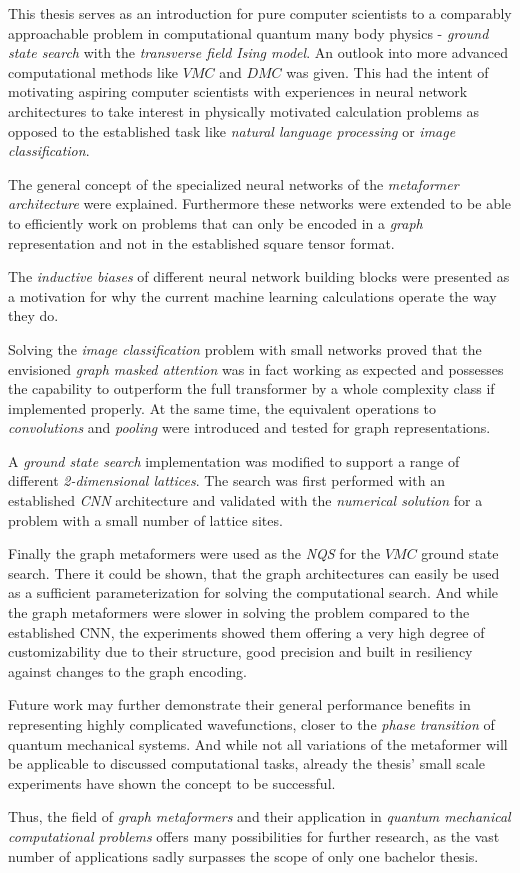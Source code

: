 This thesis serves as an introduction for pure computer scientists to a comparably approachable problem in computational quantum many body physics - \emph{ground state search} with the \emph{transverse field Ising model}.
An outlook into more advanced computational methods like $VMC$ and $DMC$ was given.
This had the intent of motivating aspiring computer scientists with experiences in neural network architectures to take interest in physically motivated calculation problems as opposed to the established task like \emph{natural language processing} or \emph{image classification}.

The general concept of the specialized neural networks of the \emph{metaformer architecture} were explained.
Furthermore these networks were extended to be able to efficiently work on problems that can only be encoded in a \emph{graph} representation and not in the established square tensor format.

The \emph{inductive biases} of different neural network building blocks were presented as a motivation for why the current machine learning calculations operate the way they do.

Solving the \emph{image classification} problem with small networks proved that the envisioned \emph{graph masked attention} was in fact working as expected and possesses the capability to outperform the full transformer by a whole complexity class if implemented properly.
At the same time, the equivalent operations to \emph{convolutions} and \emph{pooling} were introduced and tested for graph representations.

A \emph{ground state search} implementation was modified to support a range of different \emph{2-dimensional lattices}.
The search was first performed with an established \emph{CNN} architecture and validated with the \emph{numerical solution} for a problem with a small number of lattice sites.

Finally the graph metaformers were used as the \emph{NQS} for the $VMC$ ground state search.
There it could be shown, that the graph architectures can easily be used as a sufficient parameterization for solving the computational search.
And while the graph metaformers were slower in solving the problem compared to the established CNN, the experiments showed them offering a very high degree of customizability due to their structure, good precision and built in resiliency against changes to the graph encoding.

Future work may further demonstrate their general performance benefits in representing highly complicated wavefunctions, closer to the \emph{phase transition} of quantum mechanical systems.
And while not all variations of the metaformer will be applicable to discussed computational tasks, already the thesis' small scale experiments have shown the concept to be successful.

Thus, the field of \emph{graph metaformers} and their application in \emph{quantum mechanical computational problems} offers many possibilities for further research, as the vast number of applications sadly surpasses the scope of only one bachelor thesis.
